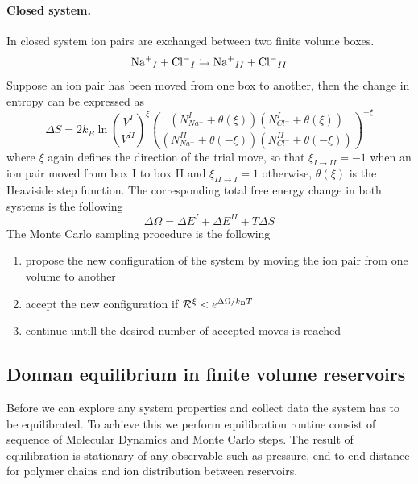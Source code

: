 \documentclass[journal=mamobx, layout=twocolumns,manuscript=article]{achemso}
\begin{document}
\paragraph{Closed system.}
In closed system ion pairs are exchanged between two finite volume boxes.
\begin{equation}
    \mathrm{Na^+}_{I} + \mathrm{Cl^-}_{I} \leftrightarrows \mathrm{Na^+}_{II} + \mathrm{Cl^-}_{II}
\end{equation}
Suppose an ion pair has been moved from one box to another, then the change in entropy can be expressed as
\begin{equation}
    \Delta S = 2 k_B \ln \left(\frac{V^{I}}{V^{II}} \right) ^ {\xi}  \left(\frac{(N_{Na^{+}}^{I}+\theta(\xi))(N_{Cl^{-}}^{I}+\theta(\xi))}{(N_{Na^{+}}^{II}+\theta(-\xi))(N_{Cl^{-}}^{II}+\theta(-\xi))}\right)^{-\xi}
\end{equation}
where $\xi$ again defines the direction of the trial move, so that $\xi_{I \rightarrow II} = -1$ when an ion pair moved from box I to box II and  $\xi_{II \rightarrow I} = 1$ otherwise, $\theta(\xi)$ is the Heaviside step function.
The corresponding total free energy change in both systems is the following 
\begin{equation}
\Delta\Omega = \Delta E^{I}+\Delta E^{II}+T\Delta S
\end{equation}
The Monte Carlo sampling procedure is the following
\begin{enumerate}
	\item propose the new configuration of the system by moving the ion pair from one volume to another 
	\item accept the new configuration if $\mathcal{R}^{\xi}<e^{\Delta\Omega/k_\mathrm{B}T}$
	\item continue untill the desired number of accepted moves is reached
\end{enumerate}

\subsection{Donnan equilibrium in finite volume reservoirs}
Before we can explore any system properties and collect data the system has to be equilibrated. To achieve this we perform equilibration routine consist of sequence of Molecular Dynamics and Monte Carlo steps.
The result of equilibration is stationary of any observable such as pressure, end-to-end distance for polymer chains and ion distribution between reservoirs. 
\end{document}
